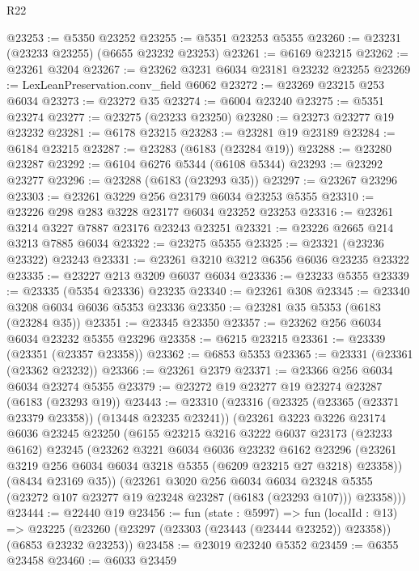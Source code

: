 \begin{lexlean}{R22}
\begin{coremodule}
@23253 := @5350 @23252
@23255 := @5351 @23253 @5355
@23260 := @23231 (@23233 @23255) (@6655 @23232 @23253)
@23261 := @6169 @23215
@23262 := @23261 @3204
@23267 := @23262 @3231 @6034 @23181 @23232 @23255
@23269 := LexLeanPreservation.conv_field @6062
@23272 := @23269 @23215 @253 @6034
@23273 := @23272 @35
@23274 := @6004 @23240
@23275 := @5351 @23274
@23277 := @23275 (@23233 @23250)
@23280 := @23273 @23277 @19 @23232
@23281 := @6178 @23215
@23283 := @23281 @19 @23189
@23284 := @6184 @23215
@23287 := @23283 (@6183 (@23284 @19))
@23288 := @23280 @23287
@23292 := @6104 @6276 @5344 (@6108 @5344)
@23293 := @23292 @23277
@23296 := @23288 (@6183 (@23293 @35))
@23297 := @23267 @23296
@23303 := @23261 @3229 @256 @23179 @6034 @23253 @5355
@23310 := @23226 @298 @283 @3228 @23177 @6034 @23252 @23253
@23316 := @23261 @3214 @3227 @7887 @23176 @23243 @23251
@23321 := @23226 @2665 @214 @3213 @7885 @6034
@23322 := @23275 @5355
@23325 := @23321 (@23236 @23322) @23243
@23331 := @23261 @3210 @3212 @6356 @6036 @23235 @23322
@23335 := @23227 @213 @3209 @6037 @6034
@23336 := @23233 @5355
@23339 := @23335 (@5354 @23336) @23235
@23340 := @23261 @308
@23345 := @23340 @3208 @6034 @6036 @5353 @23336
@23350 := @23281 @35 @5353 (@6183 (@23284 @35))
@23351 := @23345 @23350
@23357 := @23262 @256 @6034 @6034 @23232 @5355 @23296
@23358 := @6215 @23215
@23361 := @23339 (@23351 (@23357 @23358))
@23362 := @6853 @5353
@23365 := @23331 (@23361 (@23362 @23232))
@23366 := @23261 @2379
@23371 := @23366 @256 @6034 @6034 @23274 @5355
@23379 := @23272 @19 @23277 @19 @23274 @23287 (@6183 (@23293 @19))
@23443 := @23310
    (@23316
      (@23325 (@23365 (@23371 @23379 @23358)) (@13448 @23235 @23241))
      (@23261
        @3223
        @3226
        @23174
        @6036
        @23245
        @23250
        (@6155
          @23215
          @3216
          @3222
          @6037
          @23173
          (@23233 @6162)
          @23245
          (@23262
            @3221
            @6034
            @6036
            @23232
            @6162
            @23296
            (@23261 @3219 @256 @6034 @6034 @3218 @5355 (@6209 @23215 @27 @3218) @23358))
          (@8434 @23169 @35))
        (@23261
          @3020
          @256
          @6034
          @6034
          @23248
          @5355
          (@23272 @107 @23277 @19 @23248 @23287 (@6183 (@23293 @107)))
          @23358)))
@23444 := @22440 @19
@23456 := fun (state : @5997) =>
  fun (localId : @13) =>
  @23225 (@23260 (@23297 (@23303 (@23443 (@23444 @23252)) @23358)) (@6853 @23232 @23253))
@23458 := @23019 @23240 @5352
@23459 := @6355 @23458
@23460 := @6033 @23459

\end{coremodule}
\end{lexlean}

